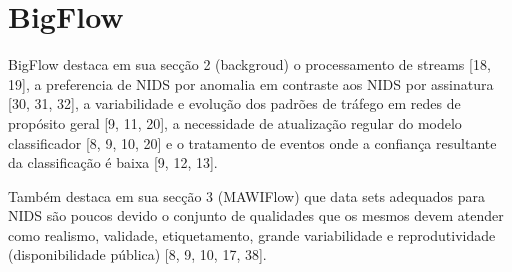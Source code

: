 \section{BigFlow}


BigFlow destaca em sua secção 2 (backgroud) o processamento de streams [18, 19],
a preferencia de NIDS por anomalia em contraste aos NIDS por assinatura [30, 31, 32],
a variabilidade e evolução dos padrões de tráfego em redes de propósito geral [9, 11, 20],
a necessidade de atualização regular do modelo classificador [8, 9, 10, 20] e
o tratamento de eventos onde a confiança resultante da classificação é baixa [9, 12, 13].

Também destaca em sua secção 3 (MAWIFlow) 
que data sets adequados para NIDS são poucos devido o conjunto de qualidades que os mesmos
devem atender como realismo, validade, etiquetamento, grande variabilidade
e reprodutividade (disponibilidade pública) [8, 9, 10, 17, 38].


